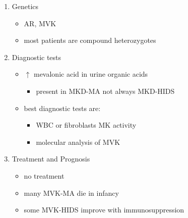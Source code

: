 \documentclass{scrartcl}
\begin{document}
\begin{enumerate}
\item Genetics
\label{sec:org0d11acd}
\begin{itemize}
\item AR, MVK
\item most patients are compound heterozygotes
\end{itemize}

\item Diagnostic tests
\label{sec:orgcf51a02}
\begin{itemize}
\item \(\uparrow\) mevalonic acid in urine organic acids
\begin{itemize}
\item present in MKD-MA not always MKD-HIDS
\end{itemize}
\item best diagnostic tests are:
\begin{itemize}
\item WBC or fibroblasts MK activity
\item molecular analysis of MVK
\end{itemize}
\end{itemize}

\item Treatment and Prognosis
\label{sec:org0e01664}
\begin{itemize}
\item no treatment
\item many MVK-MA die in infancy
\item some MVK-HIDS improve with immunosuppression
\end{itemize}
\end{enumerate}
\end{document}
